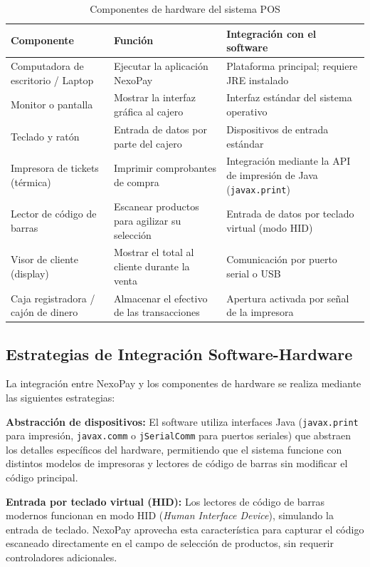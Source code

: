 \documentclass[12pt,a4paper]{report}
\begin{document}
\begin{table}[H]
\centering
\caption{Componentes de hardware del sistema POS}
\label{tab:hardware}
\begin{tabular}{|p{4cm}|p{4cm}|p{6cm}|}
\hline
\textbf{Componente} & \textbf{Función} & \textbf{Integración con el software} \\ \hline
Computadora de escritorio / Laptop & Ejecutar la aplicación NexoPay & Plataforma principal; requiere JRE instalado \\ \hline
Monitor o pantalla & Mostrar la interfaz gráfica al cajero & Interfaz estándar del sistema operativo \\ \hline
Teclado y ratón & Entrada de datos por parte del cajero & Dispositivos de entrada estándar \\ \hline
Impresora de tickets (térmica) & Imprimir comprobantes de compra & Integración mediante la API de impresión de Java (\texttt{javax.print}) \\ \hline
Lector de código de barras & Escanear productos para agilizar su selección & Entrada de datos por teclado virtual (modo HID) \\ \hline
Visor de cliente (display) & Mostrar el total al cliente durante la venta & Comunicación por puerto serial o USB \\ \hline
Caja registradora / cajón de dinero & Almacenar el efectivo de las transacciones & Apertura activada por señal de la impresora \\ \hline
\end{tabular}
\end{table}

\subsection{Estrategias de Integración Software-Hardware}

La integración entre NexoPay y los componentes de hardware se realiza mediante las siguientes estrategias:

\textbf{Abstracción de dispositivos:} El software utiliza interfaces Java (\texttt{javax.print} para impresión, \texttt{javax.comm} o \texttt{jSerialComm} para puertos seriales) que abstraen los detalles específicos del hardware, permitiendo que el sistema funcione con distintos modelos de impresoras y lectores de código de barras sin modificar el código principal.

\textbf{Entrada por teclado virtual (HID):} Los lectores de código de barras modernos funcionan en modo HID (\textit{Human Interface Device}), simulando la entrada de teclado. NexoPay aprovecha esta característica para capturar el código escaneado directamente en el campo de selección de productos, sin requerir controladores adicionales.
\end{document}
